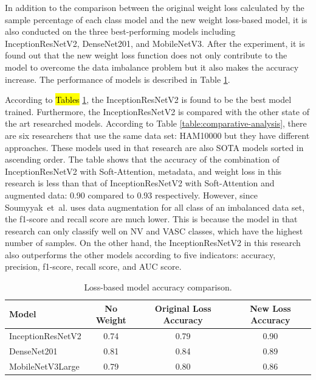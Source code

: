 \documentclass[sensors,article,accept,pdftex,moreauthors]{Definitions/mdpi}
\begin{document}
	In addition to the comparison between the original weight loss calculated by the sample percentage of each class model and the new weight loss-based model, it is also conducted on the three best-performing models including InceptionResNetV2, DenseNet201, and MobileNetV3. After the experiment, it is found out that the new weight loss function does not only contribute to the model to overcome the data imbalance problem but it also makes the accuracy increase. The performance of models is described in Table \ref{table:loss-comparision}.
	
	According to \hl{Tables} %
	\ref{table:loss-comparision}, the InceptionResNetV2 is found to be the best model trained. Furthermore, the InceptionResNetV2 is compared with the other state of the art researched models. According to Table \ref{table:comparative-analysis}, there are six researchers that use the same data set: HAM10000 but they have  different approaches. These models used in that research are also SOTA models sorted in ascending order. The table shows that the accuracy of the combination of InceptionResNetV2 with Soft-Attention, metadata, and weight loss in this research is less than that of InceptionResNetV2 with Soft-Attention and augmented data: 0.90 compared to 0.93 respectively. However, since Soumyyak~et~al. uses data augmentation for all class of an imbalanced data set, the f1-score and recall score are much lower. This is because the model in that research can only classify well on NV and VASC classes, which have the highest number of samples. On the other hand, the InceptionResNetV2 in this research also outperforms the other models according to five indicators: accuracy, precision, f1-score, recall score, and AUC score. 
	\begin{table}[H]
			\caption{Loss-based model accuracy comparison.}
		\label{table:loss-comparision}
	\setlength{\tabcolsep}{2.8mm}\begin{tabular}{ l  c  c  c }
\toprule
\textbf{Model} & \textbf{No Weight} & \textbf{Original Loss Accuracy} & \textbf{New Loss Accuracy}\\
\midrule
InceptionResNetV2 & 0.74 & 0.79 & 0.90\\
DenseNet201 & 0.81 & 0.84 & 0.89\\
MobileNetV3Large & 0.79 & 0.80 & 0.86\\
\bottomrule
		\end{tabular}
	\end{table} 
\unskip
\end{document}
